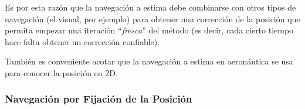 \documentclass[a4paper,12pt,twoside]{article}
\begin{document}
Es por esta raz\'on que la navegaci\'on a estima debe combinarse con otros tipos de navegaci\'on (el visual, por ejemplo) para obtener una correcci\'on de la posici\'on que permita empezar una iteraci\'on ``\textit{fresca}'' del m\'etodo (es decir, cada cierto tiempo hace falta obtener un correcci\'on confiable).

Tambi\'en es conveniente acotar que la navegaci\'on a estima en aeron\'autica se usa para conocer la posici\'on en 2D.


\subsubsection{Navegaci\'on por Fijaci\'on de la Posici\'on}

\end{document}
